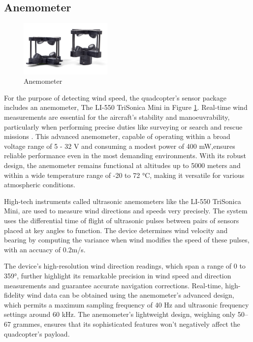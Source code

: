 \documentclass{report}
\begin{document}
\subsection{Anemometer}
\begin{figure}[H]
  \centering
  \includegraphics[width=0.4\textwidth]{Pictures/Anemometer.png}
  \caption{Anemometer}
  \label{fig:Anemometer}
\end{figure}

For the purpose of detecting wind speed, the quadcopter's sensor package
includes an anemometer, The LI-550 TriSonica Mini in
Figure \ref{fig:Anemometer}. Real-time wind measurements are essential for the
aircraft's stability and manoeuvrability, particularly when performing precise
duties like surveying or search and rescue missions \cite{uav_wilderness_sar}.
This advanced anemometer, capable of operating within a broad voltage range of 5
- 32 V and consuming a modest power of 400 mW,ensures reliable performance even
in the most demanding environments. With its robust design, the anemometer
remains functional at altitudes up to 5000 meters and within a wide temperature
range of -20 to 72 °C, making it versatile for various atmospheric conditions.

High-tech instruments called ultrasonic anemometers like the LI-550 TriSonica
Mini, are used to measure wind directions and speeds very precisely. The system
uses the differential time of flight of ultrasonic pulses between pairs of
sensors placed at key angles to function. The device determines wind velocity
and bearing by computing the variance when wind modifies the speed of these
pulses, with an accuacy of 0.2m/s.

The device's high-resolution wind direction readings, which span a range of 0 to
359°, further highlight its remarkable precision in wind speed and direction
measurements and guarantee accurate navigation corrections. Real-time,
high-fidelity wind data can be obtained using the anemometer's advanced design,
which permits a maximum sampling frequency of 40 Hz and ultrasonic frequency
settings around 60 kHz. The anemometer's lightweight design, weighing only 50–67
grammes, ensures that its sophisticated features won't negatively affect the
quadcopter's payload.
\end{document}
